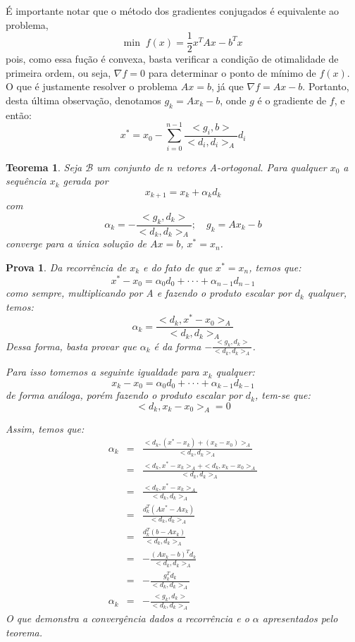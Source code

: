 \documentclass [a4paper,10pt]{article}
\newtheorem{te}{Teorema}
\newtheorem{pa}{Prova}
\begin{document}
{    É importante notar que o método dos gradientes conjugados é equivalente ao problema,
    $$
    \mathrm{min}\;\;f(x) = \frac{1}{2}x^TAx - b^Tx
    $$
    pois, como essa fução é convexa, basta verificar a condição de otimalidade de primeira ordem, ou seja, $\nabla f = 0$
    para determinar o ponto de mínimo de $f(x)$. O que é justamente resolver o problema $Ax = b$, já que $\nabla f = Ax - b$.
    Portanto, desta última observação, denotamos $g_k = Ax_k - b$, onde $g$ é o gradiente de $f$, e então:
    $$
    x^* = x_0 - \sum_{i = 0}^{n - 1}\frac{<g_i, b>}{<d_i, d_i>_A}d_i
    $$

    \begin{te}
        Seja $\mathcal{B}$ um conjunto de $n$ vetores A-ortogonal. Para qualquer $x_0$ a sequência ${x_k}$ gerada por
        $$
        x_{k+1} = x_k + \alpha_k d_k
        $$
        com
        $$
        \alpha_k = -\frac{<g_k, d_k>}{<d_k, d_k>_A};\quad g_k = Ax_k - b
        $$
        converge para a única solução de $Ax = b$, $x^* = x_n$.
    \end{te}
    \begin{pa}
        Da recorrência de $x_k$ e do fato de que $x^* = x_n$, temos que:
        $$
        x^* - x_0 = \alpha_0d_0 + \cdot\cdot\cdot + \alpha_{n - 1}d_{n - 1}
        $$
        como sempre, multiplicando por A e fazendo o produto escalar por $d_k$ qualquer, temos:
        $$
        \alpha_k = \frac{<d_k, x^* - x_0>_A}{<d_k, d_k>_A}
        $$
        Dessa forma, basta provar que $\alpha_k$ é da forma $-\frac{<g_k, d_k>}{<d_k, d_k>_A}$.

        Para isso tomemos a seguinte igualdade para $x_k$ qualquer:
        $$
        x_k - x_0 = \alpha_0d_0 + \cdot\cdot\cdot + \alpha_{k - 1}d_{k - 1}
        $$
        de forma análoga, porém fazendo o produto escalar por $d_k$, tem-se que:
        $$
        <d_k, x_k - x_0>_A = 0
        $$

        Assim, temos que:
        \begin{eqnarray*}
            \alpha_k & = & \frac{<d_k, (x^* - x_k) + (x_k - x_0)>_A}{<d_k, d_k>_A}\\
             & = & \frac{<d_k, x^* - x_k>_A + <d_k, x_k - x_0>_A}{<d_k, d_k>_A}\\
             & = & \frac{<d_k, x^* - x_k>_A}{<d_k, d_k>_A}\\
             & = & \frac{d_k^T(Ax^* - Ax_k)}{<d_k, d_k>_A}\\
             & = & \frac{d_k^T(b - Ax_k)}{<d_k, d_k>_A}\\
             & = & -\frac{(Ax_k - b)^Td_k}{<d_k, d_k>_A}\\
             & = & -\frac{g_k^Td_k}{<d_k, d_k>_A}\\
             \alpha_k & = & -\frac{<g_k, d_k>}{<d_k, d_k>_A}
        \end{eqnarray*}
        O que demonstra a convergência dados a recorrência e o $\alpha$ apresentados pelo teorema.


\end{pa}}
\end{document}

